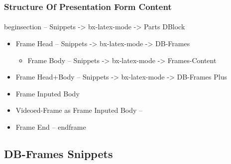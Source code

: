 \begin{frame}[fragile,label=StructureOfPresentationFormContent]
    \frametitle{Structure Of Presentation Form Content}
    \framesubtitle{}

    begin{section}  -- Snippets -> bx-latex-mode -> Parts DBlock
    
    \begin{itemize}

    \item Frame Head   -- Snippets -> bx-latex-mode -> DB-Frames
      \begin{itemize}
      \item Frame Body   -- Snippets -> bx-latex-mode -> Frames-Content
      \end{itemize}
    \item Frame Head+Body   -- Snippets -> bx-latex-mode -> DB-Frames Plus
    \item Frame Inputed Body 
    \item Videoed-Frame as Frame Inputed Body --
    \item Frame End    -- end{frame}
    \end{itemize}

\end{frame}



\begin{comment}
**  [[elisp:(org-cycle)][| ]] [[elisp:(org-show-subtree)][|=]] [[elisp:(show-children 10)][|V]] [[elisp:(bx:orgm:indirectBufOther)][|>]] [[elisp:(bx:orgm:indirectBufMain)][|I]] [[elisp:(blee:ppmm:org-mode-toggle)][|N]] [[elisp:(org-top-overview)][|O]] [[elisp:(progn (org-shifttab) (org-content))][|C]] [[elisp:(delete-other-windows)][|1]]  /Subsection/   DB-Frames Snippets ::  [[elisp:(org-cycle)][| ]]
\end{comment}

\subsection{DB-Frames Snippets}


\begin{comment}
*****  [[elisp:(org-cycle)][| ]]  [[elisp:(blee:ppmm:org-mode-toggle)][Nat]] [[elisp:(beginning-of-buffer)][Top]] [[elisp:(delete-other-windows)][(1)]] || /Frame/ *Label=DB-FramesSnippets*  DB-Frames Snippets ::  [[elisp:(org-cycle)][| ]]
\end{comment}


